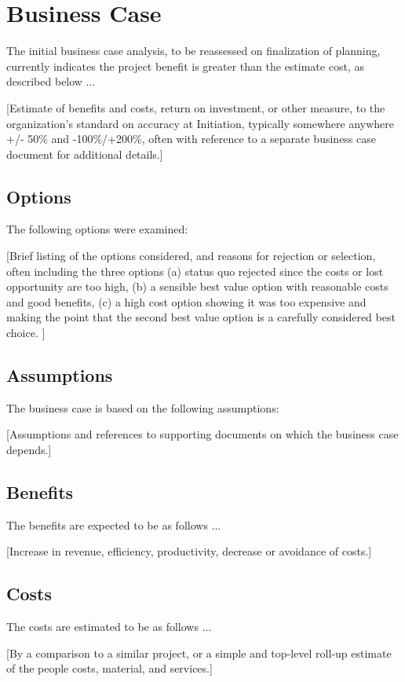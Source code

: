 \documentclass[11pt,letterpaper]{article}
\begin{document}
\section{Business Case}
The initial business case analysis, to be reassessed on finalization of planning, currently indicates the project benefit is greater than the estimate cost, as described below ...

    [Estimate of benefits and costs, return on investment, or other measure, to the organization's standard on accuracy at Initiation, typically somewhere anywhere +/- 50\% and -100\%/+200\%, often with reference to a separate business case document for additional details.]

\subsection{Options}
The following options were examined:

[Brief listing of the options considered, and reasons for rejection or selection, often including the three options (a) status quo rejected since the costs or lost opportunity are too high, (b) a sensible best value option with reasonable costs and good benefits, (c) a high cost option showing it was too expensive and making the point that the second best value option is a carefully considered best choice. ]

\subsection{Assumptions}
The business case is based on the following assumptions:

[Assumptions and references to supporting documents on which the business case depends.]

\subsection{Benefits}
The benefits are expected to be as follows ...

    [Increase in revenue, efficiency, productivity, decrease or avoidance of costs.]

\subsection{Costs}
The costs are estimated to be as follows ...

    [By a comparison to a similar project, or a simple and top-level roll-up estimate of the people costs, material, and services.]
\end{document}

